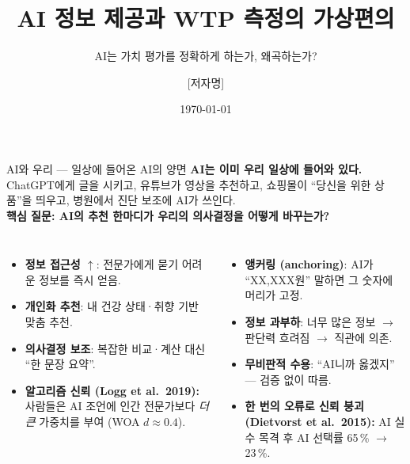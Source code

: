 \documentclass[aspectratio=169]{beamer}
\title{AI 정보 제공과 WTP 측정의 가상편의}
\subtitle{AI는 가치 평가를 정확하게 하는가, 왜곡하는가?}
\author{[저자명]}
\institute{[소속]}
\date{\today}
\begin{document}

\frame{\titlepage}

\begin{frame}{AI와 우리 --- 일상에 들어온 AI의 양면}
  \footnotesize
  \textbf{AI는 이미 우리 일상에 들어와 있다.}
  ChatGPT에게 글을 시키고, 유튜브가 영상을 추천하고, 쇼핑몰이 ``당신을 위한 상품''을 띄우고, 병원에서 진단 보조에 AI가 쓰인다.\\
  \textbf{핵심 질문: AI의 추천 한마디가 우리의 의사결정을 어떻게 바꾸는가?}

  \vspace{0.6em}
  \begin{columns}[T,onlytextwidth]
    \begin{itemize}\itemsep0.15em
      \item \textbf{정보 접근성 $\uparrow$}: 전문가에게 묻기 어려운 정보를 즉시 얻음.
      \item \textbf{개인화 추천}: 내 건강 상태·취향 기반 맞춤 추천.
      \item \textbf{의사결정 보조}: 복잡한 비교·계산 대신 ``한 문장 요약''.
      \item \textbf{알고리즘 신뢰 (Logg et al.\ 2019):} 사람들은 AI 조언에 인간 전문가보다 \emph{더 큰} 가중치를 부여 (WOA $d \approx 0.4$).
    \end{itemize}

    \begin{itemize}\itemsep0.15em
      \item \textbf{앵커링 (anchoring)}: AI가 ``XX,XXX원'' 말하면 그 숫자에 머리가 고정.
      \item \textbf{정보 과부하}: 너무 많은 정보 $\rightarrow$ 판단력 흐려짐 $\rightarrow$ 직관에 의존.
      \item \textbf{무비판적 수용}: ``AI니까 옳겠지'' --- 검증 없이 따름.
      \item \textbf{한 번의 오류로 신뢰 붕괴 (Dietvorst et al.\ 2015):} AI 실수 목격 후 AI 선택률 65\,\% $\rightarrow$ 23\,\%.
    \end{itemize}
  \end{columns}

  \vspace{0.4em}
\end{frame}
\end{document}
